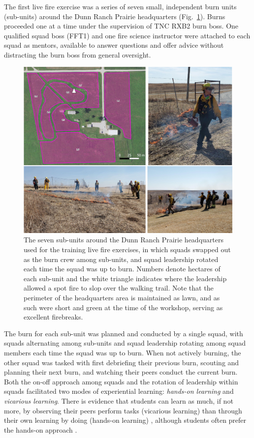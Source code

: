 \documentclass[fire,article,submit,moreauthors,pdftex]{Definitions/mdpi}
\begin{document}
The first live fire exercise was a series of seven small, independent burn units (sub-units) around the Dunn Ranch Prairie headquarters (Fig.~\ref{HQmap}).
Burns proceeded one at a time under the supervision of TNC RXB2 burn boss.
One qualified squad boss (FFT1) and one fire science instructor were attached to each squad as mentors, available to answer questions and offer advice without distracting the burn boss from general oversight.

\begin{figure}
\centering
\includegraphics[width=1\columnwidth]{HQburns.pdf}
\caption{\label{HQmap}The seven sub-units around the Dunn Ranch Prairie headquarters used for the training live fire exercises, in which squads swapped out as the burn crew among sub-units, and squad leadership rotated each time the squad was up to burn. Numbers denote hectares of each sub-unit and the white triangle indicates where the leadership allowed a spot fire to slop over the walking trail. Note that the perimeter of the headquarters area is maintained as lawn, and as such were short and green at the time of the workshop, serving as excellent firebreaks.}
\end{figure}

The burn for each sub-unit was planned and conducted by a single squad, with squads alternating among sub-units and squad leadership rotating among squad members each time the squad was up to burn.
When not actively burning, the other squad was tasked with first debriefing their previous burn, scouting and planning their next burn, and watching their peers conduct the current burn.
Both the on-off approach among squads and the rotation of leadership within squads facilitated two modes of experiential learning: \emph{hands-on learning} and \emph{vicarious learning}.
There is evidence that students can learn as much, if not more, by observing their peers perform tasks (vicarious learning) than through their own learning by doing (hands-on learning) \citep{stegmann2012}, although students often prefer the hands-on approach \citep{reime2017}.
\end{document}
